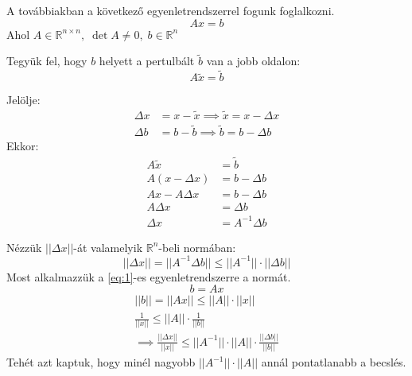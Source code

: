 A továbbiakban a következő egyenletrendszerrel fogunk foglalkozni.
\begin{equation}\label{eq:1}
    Ax = b 
\end{equation}
Ahol $A \in \mathbb{R}^{n \times n}, \; \det A \neq 0, \; b \in \mathbb{R}^{n}$

Tegyük fel, hogy  $b$ helyett a pertulbált $\tilde{b}$ van a jobb oldalon:
\begin{equation*}\label{eq:2}
    A\tilde{x} = \tilde{b}
\end{equation*}

Jelölje:
\begin{align*}
    \Delta x & = x- \tilde{x} \implies \tilde{x} = x - \Delta x \\
    \Delta b & = b - \tilde{b} \implies \tilde{b} = b - \Delta b
\end{align*}
Ekkor:
\begin{align*}
A\tilde{x} & = \tilde{b} \\
A(x - \Delta x) & = b - \Delta b \\
Ax - A\Delta x & = b - \Delta b \\ 
A\Delta x & = \Delta b \\
\Delta x & = A^{-1}\Delta b
\end{align*}

Nézzük $\lvert \lvert \Delta x \rvert  \rvert$-át valamelyik $\mathbb{R}^{n}$-beli normában:
\begin{equation*}
    \lvert \lvert \Delta x \rvert  \rvert  = \lvert \lvert A^{-1}\Delta b \rvert  \rvert \leq \lvert \lvert A^{-1} \rvert  \rvert  \cdot \lvert \lvert \Delta b \rvert  \rvert 
\end{equation*}
Most alkalmazzük a \ref{eq:1}-es egyenletrendszerre a normát.
\begin{equation*}
    b = Ax
\end{equation*}
\begin{align*}
    \lvert \lvert b \rvert  \rvert  = \lvert \lvert Ax \rvert  \rvert \leq \lvert \lvert A \rvert  \rvert \cdot \lvert \lvert x \rvert  \rvert \\
    \frac{1}{\lvert \lvert x \rvert  \rvert } \leq \lvert \lvert A \rvert  \rvert  \cdot \frac{1}{\lvert \lvert b \rvert  \rvert } \\
    \implies \frac{\lvert \lvert \Delta x \rvert  \rvert }{\lvert \lvert x \rvert  \rvert } \leq \lvert \lvert A^{-1} \rvert  \rvert  \cdot \lvert \lvert A \rvert  \rvert  \cdot \frac{\lvert \lvert \Delta b \rvert  \rvert }{\lvert \lvert b \rvert  \rvert }
\end{align*}
Tehét azt kaptuk, hogy minél nagyobb $\lvert \lvert A^{-1} \rvert  \rvert  \cdot \lvert \lvert A \rvert  \rvert$ annál pontatlanabb a becslés.

